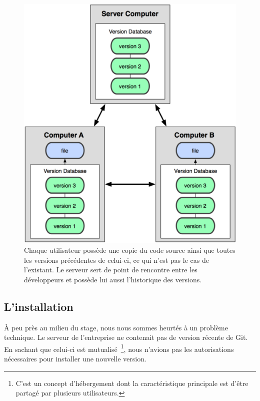 \begin{figure}
  \begin{center}
    \includegraphics[scale=1.3]{images/workflow.png}
    \caption{ Chaque utilisateur possède une copie du code source
    ainsi que toutes les versions précédentes de celui-ci, ce qui n'est pas
    le cas de l'existant. Le serveur sert de point de rencontre entre les
    développeurs et possède lui aussi l’historique des versions.}
    \label{workflow}
  \end{center}
\end{figure}

\subsection{L'installation} %
\label{sub:L'installation}

À peu près au milieu du stage, nous nous sommes heurtés à un problème
technique. Le serveur de l'entreprise ne contenait pas de version
récente de Git. En sachant que celui-ci est mutualisé\, \footnote{C'est
un concept d'hébergement dont la caractéristique principale est d'être
partagé par plusieurs utilisateurs.}, nous n'avions pas les
autorisations nécessaires pour installer une nouvelle version.

